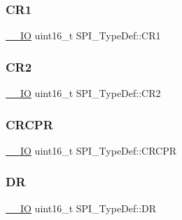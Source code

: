 \subsubsection{\texorpdfstring{CR1}{CR1}}
{\footnotesize\ttfamily \mbox{\hyperlink{group___c_m_s_i_s___c_m3__core__definitions_gaec43007d9998a0a0e01faede4133d6be}{\+\_\+\+\_\+\+IO}} uint16\+\_\+t S\+P\+I\+\_\+\+Type\+Def\+::\+C\+R1}

\mbox{\label{struct_s_p_i___type_def_ac891e34644b8dc27bacc906cfd18b235}} 
\subsubsection{\texorpdfstring{CR2}{CR2}}
{\footnotesize\ttfamily \mbox{\hyperlink{group___c_m_s_i_s___c_m3__core__definitions_gaec43007d9998a0a0e01faede4133d6be}{\+\_\+\+\_\+\+IO}} uint16\+\_\+t S\+P\+I\+\_\+\+Type\+Def\+::\+C\+R2}

\mbox{\label{struct_s_p_i___type_def_a353c64e49ec9ae93b950668941f41175}} 
\subsubsection{\texorpdfstring{CRCPR}{CRCPR}}
{\footnotesize\ttfamily \mbox{\hyperlink{group___c_m_s_i_s___c_m3__core__definitions_gaec43007d9998a0a0e01faede4133d6be}{\+\_\+\+\_\+\+IO}} uint16\+\_\+t S\+P\+I\+\_\+\+Type\+Def\+::\+C\+R\+C\+PR}

\mbox{\label{struct_s_p_i___type_def_ae192c943732b6ab5e5611e860cc05544}} 
\subsubsection{\texorpdfstring{DR}{DR}}
{\footnotesize\ttfamily \mbox{\hyperlink{group___c_m_s_i_s___c_m3__core__definitions_gaec43007d9998a0a0e01faede4133d6be}{\+\_\+\+\_\+\+IO}} uint16\+\_\+t S\+P\+I\+\_\+\+Type\+Def\+::\+DR}

\mbox{\label{struct_s_p_i___type_def_a20a4775ce461eec0d9a437bed464c0a5}} 
